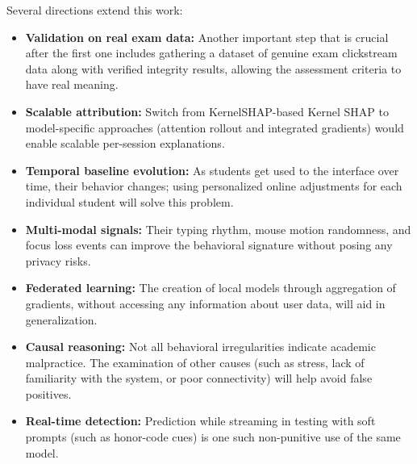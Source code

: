 \documentclass[sigconf]{acmart}
\begin{document}
Several directions extend this work:
\begin{itemize}
    \item \textbf{Validation on real exam data:} Another important step that is crucial after the first one includes gathering a dataset of genuine exam clickstream data along with verified integrity results, allowing the assessment criteria to have real meaning.
    \item \textbf{Scalable attribution:} Switch from KernelSHAP-based  Kernel SHAP to model-specific approaches (attention rollout and integrated gradients) would enable scalable per-session explanations.
    \item \textbf{Temporal baseline evolution:} As students get used to the interface over time, their behavior changes; using personalized online adjustments for each individual student will solve this problem.
    \item \textbf{Multi-modal signals:} Their typing rhythm, mouse motion randomness, and focus loss events can improve the behavioral signature without posing any privacy risks.
    \item \textbf{Federated learning:} The creation of local models through aggregation of gradients, without accessing any information about user data, will aid in generalization. 
    \item \textbf{Causal reasoning:}  Not all behavioral irregularities indicate academic malpractice. The examination of other causes (such as stress, lack of familiarity with the system, or poor connectivity) will help avoid false positives.
    \item \textbf{Real-time detection:} Prediction while streaming in testing with soft prompts (such as honor-code cues) is one such non-punitive use of the same model.
\end{itemize}



\end{document}
